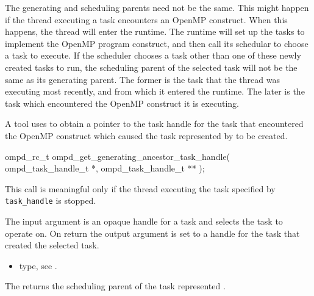 The generating and scheduling parents need not be the same. This might happen if the thread 
executing a task encounters an OpenMP construct. When this happens, the thread will enter the 
runtime. The runtime will set up the tasks to implement the OpenMP program construct, and then 
call its schedular to choose a task to execute. If the scheduler chooses a task other than one of 
these newly created tasks to run, the scheduling parent of the selected task will not be the same 
as its generating parent. The former is the task that the thread was executing most recently,
and from which it entered the runtime. The later is the task which encountered the OpenMP 
construct it is executing.

\label{ompd:ompd_get_generating_ancestor_task_handle}
\summary
A tool uses  to obtain
a pointer to the task handle for the task that encountered the OpenMP construct which caused the 
task represented by  to be created.

\format

\begin{cspecific}
\begin{ompSyntax}
ompd_rc_t ompd_get_generating_ancestor_task_handle(
  ompd_task_handle_t *,
  ompd_task_handle_t **
);
\end{ompSyntax}
\end{cspecific}


\descr
This call is meaningful only if the thread executing the task specified by
\verb|task_handle|  is stopped.

\argdesc
The input argument  is an opaque handle for a task and selects the task to operate on.
On return the output argument  is set to a handle for the task
that created the selected task.

\crossreferences
\begin{itemize}
	\item {} type, see .
\end{itemize}


\label{ompd:ompd_get_scheduling_ancestor_task_handle}
\summary
The  returns the
scheduling parent of the task represented .

